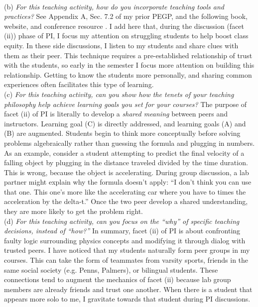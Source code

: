 \documentclass[../../../main.tex]{subfiles}
\begin{document}
\\
\vspace{0.25cm}
(b) \textit{For this teaching activity, how do you incorporate teaching tools and practices?}  See Appendix A, Sec. 7.2 of my prior PEGP, and the following book, website, and conference resource \cite{mazur2013peer,PhysPort,AAPTPI}.  I add here that, during the discussion (facet (ii)) phase of PI, I focus my attention on struggling students to help boost class equity.  In these side discussions, I listen to my students and share clues with them as their peer.  This technique requires a pre-established relationship of trust with the students, so early in the semester I focus more attention on building this relationship.  Getting to know the students more personally, and sharing common experiences often facilitates this type of learning.
\\
\vspace{0.25cm}
(c) \textit{For this teaching activity, can you show how the tenets of your teaching philosophy help achieve learning goals you set for your courses?}  The purpose of facet (ii) of PI is literally to develop a \textit{shared meaning} between peers and instructors.  Learning goal (C) is directly addressed, and learning goals (A) and (B) are augmented.  Students begin to think more conceptually before solving problems algebraically rather than guessing the formula and plugging in numbers.  As an example, consider a student attempting to predict the final velocity of a falling object by plugging in the distance traveled divided by the time duration.  This is wrong, because the object is accelerating.  During group discussion, a lab partner might explain why the formula doesn't apply:  ``I don't think you can use that one. This one's more like the accelerating car where you have to times the acceleration by the delta-t.''  Once the two peer develop a shared understanding, they are more likely to get the problem right. 
\\
\vspace{0.25cm}
(d) \textit{For this teaching activity, can you focus on the ``why'' of specific teaching decisions, instead of ``how?''} In summary, facet (ii) of PI is about confronting faulty logic surrounding physics concepts and modifying it through dialog with trusted peers.  I have noticed that my students naturally form peer groups in my courses.  This can take the form of teammates from varsity sports, friends in the same social society (e.g. Penns, Palmers), or bilingual students.  These connections tend to augment the mechanics of facet (ii) because lab group members are already friends and trust one another.  When there is a student that appears more solo to me, I gravitate towards that student during PI discussions.
\end{document}
